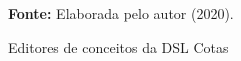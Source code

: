 \begin{figure}[ht!]
\centering

\caption{\textmd{Editores de conceitos da DSL Cotas}}
\label{fig:editors}

\par\medskip\textbf{Fonte:} Elaborada pelo autor (2020). \par\medskip

\end{figure}

